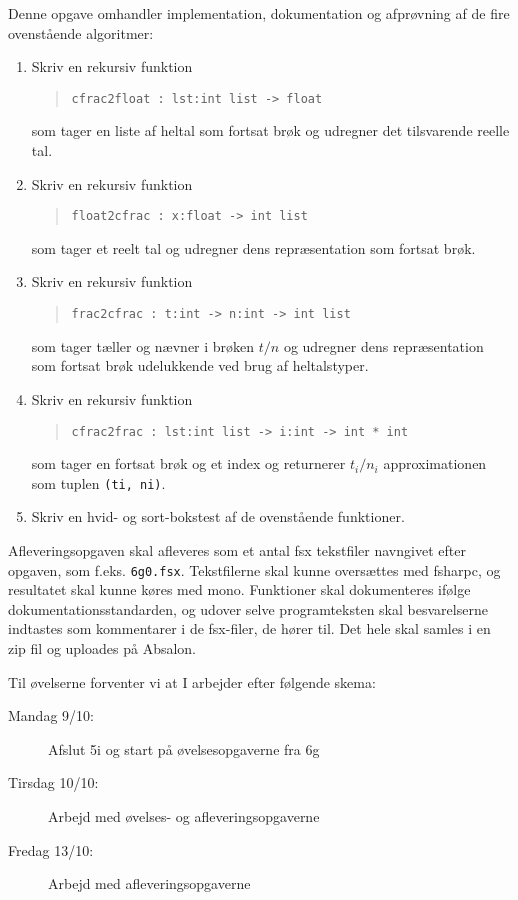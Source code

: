 \documentclass[a4paper,12pt]{article}
\begin{document}
Denne opgave omhandler implementation, dokumentation og afprøvning af de fire ovenstående algoritmer:
\begin{enumerate}[label=6g.\arabic*,start=0]
\item Skriv en rekursiv funktion
  \begin{quote}
    \lstinline{cfrac2float : lst:int list -> float}
  \end{quote}
  som tager en liste af heltal som fortsat brøk og udregner det tilsvarende reelle tal.
\item Skriv en rekursiv funktion
  \begin{quote}
    \lstinline{float2cfrac : x:float -> int list}
  \end{quote}
  som tager et reelt tal og udregner dens repræsentation som fortsat brøk.
\item Skriv en rekursiv funktion
  \begin{quote}
    \lstinline{frac2cfrac : t:int -> n:int -> int list}
  \end{quote}
  som tager tæller og nævner i brøken $t/n$ og udregner dens repræsentation som fortsat brøk udelukkende ved brug af heltalstyper.
\item Skriv en rekursiv funktion
  \begin{quote}
    \lstinline{cfrac2frac : lst:int list -> i:int -> int * int}
  \end{quote}
  som tager en fortsat brøk og et index og returnerer $t_i/n_i$ approximationen som tuplen \lstinline{(ti, ni)}.
\item Skriv en hvid- og sort-bokstest af de ovenstående funktioner.
\end{enumerate}
Afleveringsopgaven skal afleveres som et antal fsx tekstfiler navngivet efter opgaven, som f.eks. \lstinline!6g0.fsx!. Tekstfilerne skal kunne oversættes med fsharpc, og resultatet skal kunne køres med mono. Funktioner skal dokumenteres ifølge dokumentationsstandarden, og udover selve programteksten skal besvarelserne indtastes som kommentarer i de fsx-filer, de hører til. Det hele skal samles i en zip fil og uploades på Absalon.

Til øvelserne forventer vi at I arbejder efter følgende skema:
\begin{description}
\item[Mandag 9/10:] Afslut 5i og start på øvelsesopgaverne fra 6g
\item[Tirsdag 10/10:] Arbejd med øvelses- og afleveringsopgaverne
\item[Fredag 13/10:]  Arbejd med afleveringsopgaverne
\end{description}
\end{document}
